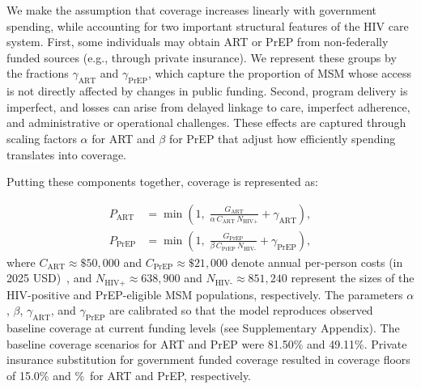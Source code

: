 \documentclass[preprint,12pt]{elsarticle}
\begin{document}

We make the assumption that coverage increases linearly with government spending, while accounting for two important structural features of the HIV care system. First, some individuals may obtain ART or PrEP from non-federally funded sources (e.g., through private insurance). We represent these groups by the fractions $\gamma_{\text{ART}}$ and $\gamma_{\text{PrEP}}$, which capture the proportion of MSM whose access is not directly affected by changes in public funding. Second, program delivery is imperfect, and losses can arise from delayed linkage to care, imperfect adherence, and administrative or operational challenges. These effects are captured through scaling factors $\alpha$ for ART and $\beta$ for PrEP that adjust how efficiently spending translates into coverage.

Putting these components together, coverage is represented as:

\begin{align}
P_{\text{ART}} &= \min\!\left(1,\;
    \frac{G_{\text{ART}}}{\alpha\, C_{\text{ART}}\, N_{\text{HIV+}}}
    + \gamma_{\text{ART}}\right), \label{eq:PART} \\[6pt]
P_{\text{PrEP}} &= \min\!\left(1,\;
    \frac{G_{\text{PrEP}}}{\beta\, C_{\text{PrEP}}\, N_{\text{HIV-}}}
    + \gamma_{\text{PrEP}}\right), \label{eq:PPrEP}
\end{align}
where $C_{\text{ART}} \approx \$50{,}000$ and $C_{\text{PrEP}} \approx \$21{,}000$ denote annual per-person costs (in 2025 USD)~\cite{prepcosts2018, BinghamFarnham2021}, and $N_{\text{HIV+}} \approx 638{,}900$ and $N_{\text{HIV-}} \approx 851{,}240$ represent the sizes of the HIV-positive and PrEP-eligible MSM populations, respectively. The parameters $\alpha$, $\beta$, $\gamma_{\text{ART}}$, and $\gamma_{\text{PrEP}}$ are calibrated so that the model reproduces observed baseline coverage at current funding levels (see Supplementary Appendix).
The baseline coverage scenarios for ART and PrEP were 81.50\% and 49.11\%. Private insurance substitution for government funded coverage resulted in coverage floors of 15.0\% and \gammaPrEPBaseline\%\ for ART and PrEP, respectively. 
\end{document}
